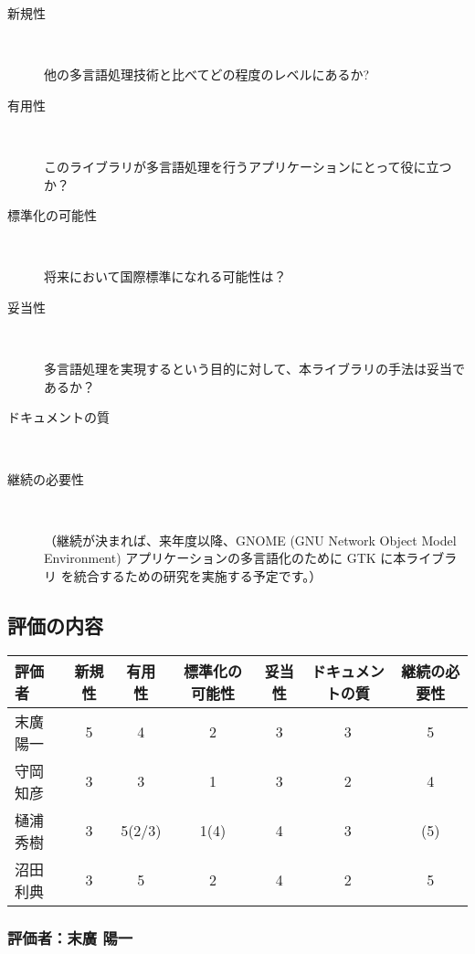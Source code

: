 \begin{description}

\item[新規性] \

   他の多言語処理技術と比べてどの程度のレベルにあるか?

\item[有用性] \

  このライブラリが多言語処理を行うアプリケーションにとって役に立つか？

\item[標準化の可能性] \

  将来において国際標準になれる可能性は？

\item[妥当性] \

  多言語処理を実現するという目的に対して、本ライブラリの手法は妥当であるか？

\item[ドキュメントの質] \

\item[継続の必要性] \

  （継続が決まれば、来年度以降、GNOME (GNU Network Object Model
    Environment) アプリケーションの多言語化のために GTK に本ライブラリ
    を統合するための研究を実施する予定です。）
\end{description}


\subsection{評価の内容}

\begin{tabular}{|l|c|c|c|c|c|c|}
\hline
評価者&  新規性 & 有用性 & 標準化の可能性 & 妥当性 & ドキュメントの質 & 継続の必要性 \\
\hline
末廣 陽一 &  5 & 4 & 2 & 3 & 3 & 5 \\
\hline
守岡 知彦 & 3 & 3 & 1 & 3 & 2 & 4 \\
\hline
樋浦 秀樹 & 3 & 5(2/3) & 1(4) & 4 & 3 & (5)\footnotemark\\
\hline
沼田 利典 & 3 & 5 & 2 & 4 & 2 & 5\\
\hline
\end{tabular}


\subsubsection{評価者：末廣 陽一}

